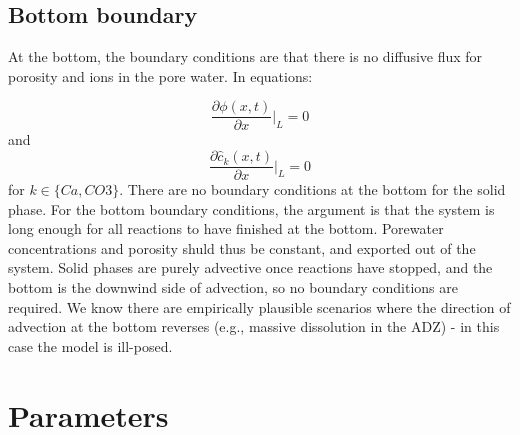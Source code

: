 \documentclass[10pt, letterpaper]{article}
\begin{document}
\subsection{Bottom boundary}
At the bottom, the boundary conditions are that there is no diffusive flux for porosity and ions in the pore water. In equations:

\begin{equation}
    \frac{\partial \phi(x,t)}{\partial x} \big|_L = 0 \tag{35}
\end{equation}
and 
\begin{equation}
     \frac{\partial \hat c_k (x,t)}{\partial x} \big|_L = 0 \tag{35}
\end{equation}
for $k \in \{ Ca, CO3\} $. There are no boundary conditions at the bottom for the solid phase. 
For the bottom boundary conditions, the argument is that the system is long enough for all reactions to have finished at the bottom. Porewater concentrations and porosity shuld thus be constant, and exported out of the system. Solid phases are purely advective once reactions have stopped, and the bottom is the downwind side of advection, so no boundary conditions are required. We know there are empirically plausible scenarios where the direction of advection at the bottom reverses (e.g., massive dissolution in the ADZ) - in this case the model is ill-posed.

\section{Parameters}
\end{document}
